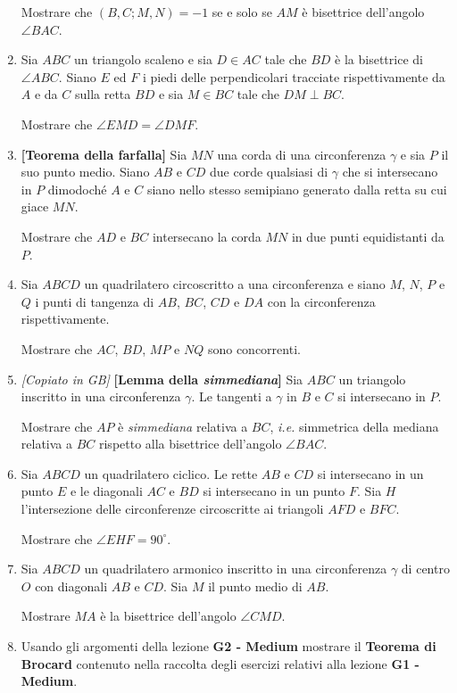\begin{enumerate}
    Mostrare che $(B,C;M,N)=-1$ se e solo se $AM$ è bisettrice dell'angolo $\angle{BAC}$.
    \item Sia $ABC$ un triangolo scaleno e sia $D \in AC$ tale che $BD$ è la bisettrice di $\angle ABC$.
    Siano $E$ ed $F$ i piedi delle perpendicolari tracciate rispettivamente da $A$ e da $C$ sulla retta $BD$ e
    sia $M \in BC$ tale che $DM \perp BC$.
    
    Mostrare che $\angle EMD=\angle DMF$.
    \item \textbf{[Teorema della farfalla]} Sia $MN$ una corda di una circonferenza $\gamma$ e sia $P$ il suo punto medio. Siano $AB$ e $CD$ due corde qualsiasi di $\gamma$ che si intersecano in $P$ dimodoché $A$ e $C$ siano nello stesso semipiano generato dalla retta su cui giace $MN$. 
    
    Mostrare che $AD$ e $BC$ intersecano la corda $MN$ in due punti equidistanti da $P$. 
    \item Sia $ABCD$ un quadrilatero circoscritto a una circonferenza e siano $M$, $N$, $P$ e $Q$ i punti di tangenza di $AB$, $BC$, $CD$ e $DA$ con la circonferenza rispettivamente. 
    
    Mostrare che $AC$, $BD$, $MP$ e $NQ$ sono concorrenti.
    \item \emph{[Copiato in GB]} \textbf{[Lemma della \textit{simmediana}]} Sia $ABC$ un triangolo inscritto in una circonferenza $\gamma$. Le tangenti a $\gamma$ in $B$ e $C$ si intersecano in $P$.
    
    Mostrare che $AP$ è \textit{simmediana} relativa a $BC$, \textit{i.e.} simmetrica della mediana relativa a $BC$ rispetto alla bisettrice dell'angolo $\angle BAC$.
    
    \item Sia $ABCD$ un quadrilatero ciclico. Le rette $AB$ e $CD$ si intersecano in un punto $E$ e le diagonali $AC$ e $BD$ si intersecano in un punto $F$. Sia $H$ l'intersezione delle circonferenze circoscritte ai triangoli $AFD$ e $BFC$. 
    
    Mostrare che $\angle EHF=90^{\circ}$.
    
    \item Sia $ABCD$ un quadrilatero armonico inscritto in una circonferenza $\gamma$ di centro $O$ con diagonali $AB$ e $CD$. Sia $M$ il punto medio di $AB$.
    
    Mostrare $MA$ è la bisettrice dell'angolo $\angle CMD$.
    \item Usando gli argomenti della lezione \textbf{G2 - Medium} mostrare il \textbf{Teorema di Brocard} contenuto nella raccolta degli esercizi relativi alla lezione \textbf{G1 - Medium}. 
    

\end{enumerate}
